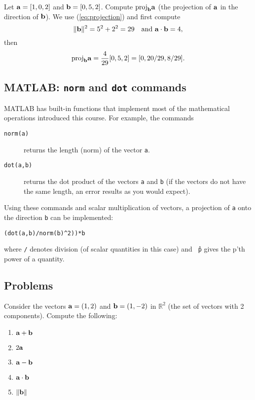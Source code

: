 \begin{example}
Let $\aa = [1,0,2]$ and $\bb = [0, 5, 2]$. Compute 
$ \mbox{proj}_{\bf b} {\bf a}$ (the projection of $\bf a$ in the
direction of $\bf b$).
{\rm We use (\ref{eq:projection}) and first compute 
\[
\| \bb \|^2 = 5^2 + 2^2 = 29 \mbox{\ \ \ and $\aa \cdot \bb = 4$}, 
\]
then 
\[
\mbox{proj}_{\bf b} {\bf a} = \frac{4}{29} [0, 5, 2] = [0, 20/29, 8/29].
\]}
\end{example}

\subsection{MATLAB: {\tt norm} and {\tt dot}  commands}

MATLAB has built-in functions that implement most of the mathematical 
operations introduced this course. For example, the commands 
\begin{description}
\item[{\tt norm(a)}] returns the length (norm) of the vector {\tt a}. 
\item[{\tt dot(a,b)}] returns the dot product of the vectors 
{\tt a} and {\tt b} (if the vectors do not have the same length, an 
error results as you would expect). 
\end{description}
Using these commands and scalar multiplication of vectors, a projection 
of {\tt a} onto the direction {\tt b} can be implemented:
\begin{verbatim}
(dot(a,b)/norm(b)^2))*b
\end{verbatim}
where {\tt /} denotes division (of scalar quantities in this case) and 
{\tt \^\ p} gives the p'th power of a quantity. 

\subsection{Problems}

\begin{problem}
  \label{2009_a1_2}
Consider the vectors ${\bf a} = (1,2)$ and ${\bf b} =
(1,-2)$ in $\mathbb{R}^2$ (the set of vectors with 2 components).
Compute the following:
\begin{enumerate}
\item ${\bf a} + {\bf b}$
\item $2 {\bf a}$
\item ${\bf a} - {\bf b}$
\item ${\bf a} \cdot {\bf b}$
\item $\| {\bf b} \|$
\end{enumerate}
\end{problem}

